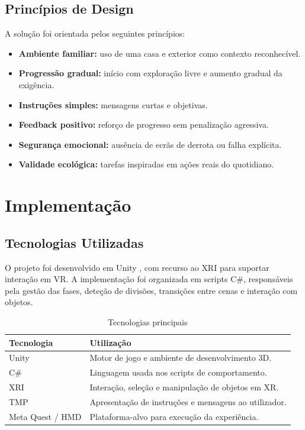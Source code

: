 \documentclass[12pt,a4paper,oneside]{report}
\newcommand{\blankpage}{
    \clearpage
    \thispagestyle{empty}
    \null
    \clearpage
}
\begin{document}
\section{Princípios de Design}

A solução foi orientada pelos seguintes princípios:

\begin{itemize}
    \item \textbf{Ambiente familiar:} uso de uma casa e exterior como contexto reconhecível.
    \item \textbf{Progressão gradual:} início com exploração livre e aumento gradual da exigência.
    \item \textbf{Instruções simples:} mensagens curtas e objetivas.
    \item \textbf{Feedback positivo:} reforço de progresso sem penalização agressiva.
    \item \textbf{Segurança emocional:} ausência de ecrãs de derrota ou falha explícita.
    \item \textbf{Validade ecológica:} tarefas inspiradas em ações reais do quotidiano.
\end{itemize}

\blankpage

\chapter{Implementação}

\section{Tecnologias Utilizadas}

O projeto foi desenvolvido em Unity \cite{unity}, com recurso ao \ac{XRI} para suportar interação em \ac{VR}. A implementação foi organizada em scripts C\#, responsáveis pela gestão das fases, deteção de divisões, transições entre cenas e interação com objetos.

\begin{table}[H]
\centering
\caption{Tecnologias principais}
\begin{tabular}{ll}
\toprule
\textbf{Tecnologia} & \textbf{Utilização} \\
\midrule
Unity & Motor de jogo e ambiente de desenvolvimento 3D. \\
C\# & Linguagem usada nos scripts de comportamento. \\
\ac{XRI} & Interação, seleção e manipulação de objetos em \ac{XR}. \\
\ac{TMP} & Apresentação de instruções e mensagens ao utilizador. \\
Meta Quest / HMD & Plataforma-alvo para execução da experiência. \\
\bottomrule
\end{tabular}
\end{table}
\end{document}
